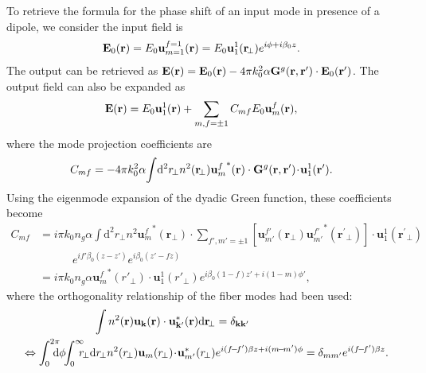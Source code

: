 \documentclass[preprint,aps,pra,onecolumn]{revtex4-1} %
\begin{document}
To retrieve the formula for the phase shift of an input mode in presence of a dipole, we consider the input field is
\begin{align}
\mathbf{E}_0(\mathbf{r}) &= E_0 \mathbf{u}_{m=1}^{f=1} (\mathbf{r}) = E_0 \mathbf{u}_1^1 (\mathbf{r}\!_\perp)e^{i\phi+i\beta_0 z}. 
\end{align}
The output can be retrieved as
$\mathbf{E}(\mathbf{r})  = \mathbf{E}_0(\mathbf{r}) -4\pi k_0^2 \alpha \mathbf{G}^g(\mathbf{r},\mathbf{r}')\cdot\mathbf{E}_0(\mathbf{r}')$.
The output field can also be expanded as
\begin{align}
\mathbf{E}(\mathbf{r}) &= E_0\mathbf{u}_{1}^{1} (\mathbf{r}) + \sum_{m,f=\pm 1} C_{mf} E_0 \mathbf{u}_m^f(\mathbf{r}),  
\end{align}
where the mode projection coefficients are
\begin{align}
C_{mf} &= -4\pi k_0^2 \alpha \!\int\! \mathrm{d}^2r\!_\perp n^2(\mathbf{r}\!_\perp){\mathbf{u}^f_m}^*(\mathbf{r})\cdot \mathbf{G}^g(\mathbf{r},\mathbf{r}') \!\cdot\! \mathbf{u}_1^1(\mathbf{r}^\prime).
\end{align}
Using the eigenmode expansion of the dyadic Green function, these coefficients become
\begin{align}
C_{mf} &= i\pi k_0 n_g\alpha \!\int\! \mathrm{d}^2r\!_\perp n^2 {\mathbf{u}^f_m}^*(\mathbf{r}\!_\perp)\cdot\!\!\!\!\!\! \sum_{f',m'=\pm 1}\!\!\!\! \left[\mathbf{u}_{m'}^{f'}(\mathbf{r}\!_\perp){\mathbf{u}^{f'}_{m'}}^*(\mathbf{r}^\prime\!_\perp) \right]\!\cdot\! \mathbf{u}_1^1(\mathbf{r}^\prime\!_\perp)\nonumber\\
&\quad\quad\quad e^{if'\beta_0(z-z')} e^{i\beta_0(z'-fz)}\\
&= i\pi k_0 n_g\alpha  {\mathbf{u}^f_m}^*(r'_{\!\perp})\cdot \mathbf{u}_1^1(r'_{\!\perp})e^{i\beta_0 (1-f)z'+i(1-m)\phi'},
\end{align}
where the orthogonality relationship of the fiber modes had been used:
\begin{align}
\int n^2(\br)  \mathbf{u}_{\mathbf{k}}(\br) \cdot \mathbf{u}^*_{\mathbf{k}'}(\br)\mathrm{d} \br\!_\perp &=\delta_{\mathbf{k}\mathbf{k}'}\\
\Leftrightarrow \int_0^{2\pi}\!\!\!\!\! \mathrm{d}\phi\!\! \int_0^\infty\!\!\!\! r\!_\perp \mathrm{d}r\!_\perp  n^2(r\!_\perp) \mathbf{u}_{m}(r\!_\perp )\!\cdot\!\mathbf{u}_{m'}^*(r\!_\perp )& e^{i(f\!-\!f')\beta z+i(m\! -\! m')\phi}  =\delta_{mm'}e^{i(f\!-\!f')\beta z} \label{eq:orthutrans}.
\end{align}
\end{document}
